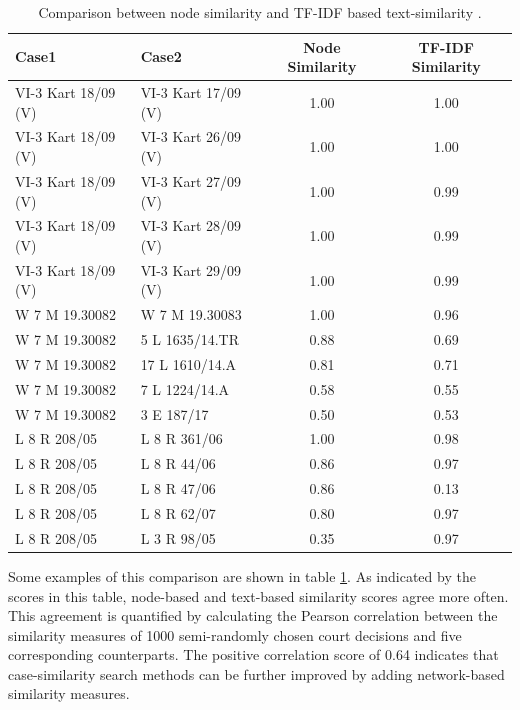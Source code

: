 \documentclass[runningheads]{llncs}
\begin{document}
\begin{table}[h!]
\centering
\begin{tabular}{|l|l|c|c|}
\hline
      Case1 &        Case2 &  Node Similarity &  TF-IDF Similarity \\\hline
\hline
 VI-3 Kart 18/09 (V) &  VI-3 Kart 17/09 (V) &             1.00 &               1.00 \\\hline
 VI-3 Kart 18/09 (V) &  VI-3 Kart 26/09 (V) &             1.00 &               1.00 \\\hline
 VI-3 Kart 18/09 (V) &  VI-3 Kart 27/09 (V) &             1.00 &               0.99 \\\hline
 VI-3 Kart 18/09 (V) &  VI-3 Kart 28/09 (V) &             1.00 &               0.99 \\\hline
 VI-3 Kart 18/09 (V) &  VI-3 Kart 29/09 (V) &             1.00 &               0.99 \\\hline\hline
 W 7 M 19.30082 &  W 7 M 19.30083 &             1.00 &               0.96 \\\hline
 W 7 M 19.30082 &  5 L 1635/14.TR &             0.88 &               0.69 \\\hline
 W 7 M 19.30082 &  17 L 1610/14.A &             0.81 &               0.71 \\\hline
 W 7 M 19.30082 &   7 L 1224/14.A &             0.58 &               0.55 \\\hline
 W 7 M 19.30082 &      3 E 187/17 &             0.50 &               0.53 \\\hline\hline
  L 8 R 208/05 &  L 8 R 361/06 &             1.00 &               0.98 \\\hline
 L 8 R 208/05 &   L 8 R 44/06 &             0.86 &               0.97 \\\hline
 L 8 R 208/05 &   L 8 R 47/06 &             0.86 &               0.13 \\\hline
 L 8 R 208/05 &   L 8 R 62/07 &             0.80 &               0.97 \\\hline
 L 8 R 208/05 &   L 3 R 98/05 &             0.35 &               0.97 \\\hline
\hline
\end{tabular}
\caption{Comparison between node similarity and TF-IDF based text-similarity \cite{milz2021analysis}.}
\label{tab:similarityTable1}
\end{table}

Some examples of this comparison are shown in table \ref{tab:similarityTable1}. As indicated by the scores in this table, node-based and text-based similarity scores agree more often. This agreement is quantified by calculating the Pearson correlation between the similarity measures of 1000 semi-randomly chosen court decisions and five corresponding counterparts. The positive correlation score of 0.64 indicates that case-similarity search methods can be further improved by adding network-based similarity measures.
\end{document}
